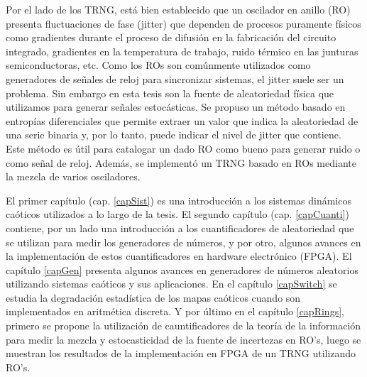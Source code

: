 Por el lado de los TRNG, está bien establecido que un oscilador en anillo (RO) presenta fluctuaciones de fase (jitter) que dependen de procesos puramente físicos como gradientes durante el proceso de difusión en la fabricación del circuito integrado, gradientes en la temperatura de trabajo, ruido térmico en las junturas semiconductoras, etc.
Como los ROs son comúnmente utilizados como generadores de señales de reloj para sincronizar sistemas, el jitter suele ser un problema.
Sin embargo en esta tesis son la fuente de aleatoriedad física que utilizamos para generar señales estocásticas.
Se propuso un método basado en entropías diferenciales que permite extraer un valor que indica la aleatoriedad de una serie binaria y, por lo tanto, puede indicar el nivel de jitter que contiene.
Este método es útil para catalogar un dado RO como bueno para generar ruido o como señal de reloj.
Además, se implementó un TRNG basado en ROs mediante la mezcla de varios osciladores.

El primer capítulo (cap. \ref{capSist}) es una introducción a los sistemas dinámicos caóticos utilizados a lo largo de la tesis.
El segundo capítulo (cap. \ref{capCuanti}) contiene, por un lado una introducción a los cuantificadores de aleatoriedad que se utilizan para medir los generadores de números, y por otro, algunos avances en la implementación de estos cuantificadores en hardware electrónico (FPGA).
El capítulo \ref{capGen} presenta algunos avances en generadores de números aleatorios utilizando sistemas caóticos y sus aplicaciones.
En el capítulo \ref{capSwitch} se estudia la degradación estadística de los mapas caóticos cuando son implementados en aritmética discreta.
Y por último en el capítulo \ref{capRings}, primero se propone la utilización de cauntificadores de la teoría de la información para medir la mezcla y estocasticidad de la fuente de incertezas en RO's, luego se muestran los resultados de la implementación en FPGA de un TRNG utilizando RO's.